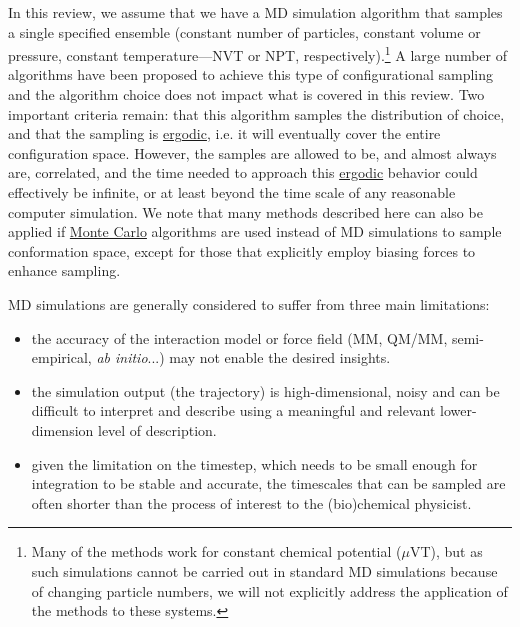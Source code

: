 \documentclass[9pt,review]{livecoms}
\begin{document}
In this review, we assume that we have a MD simulation algorithm that samples a single specified ensemble (constant number of particles, constant volume or pressure, constant temperature---NVT or NPT, respectively).\footnote{Many of the methods work for constant chemical potential ($\mu$VT), but as such simulations cannot be carried out in standard MD simulations because of changing particle numbers, we will not explicitly address the application of the methods to these systems.} A large number of algorithms have been proposed to achieve this type of configurational sampling and the algorithm choice does not impact what is covered in this review. Two important criteria remain: that this algorithm samples the distribution of choice, and that the sampling is \hyperlink{ref:ergodic} {ergodic}, i.e. it will eventually cover the entire configuration space. However, the samples are allowed to be, and almost always are, correlated, and the time needed to approach this \hyperlink{ref:ergodic} {ergodic} behavior could effectively be infinite, or at least beyond the time scale of any reasonable computer simulation. We note that many methods described here can also be applied if \hyperlink{ref:MetropolisMonteCarlo} {Monte Carlo} algorithms are used instead of MD simulations to sample conformation space, except for those that explicitly employ biasing forces to enhance sampling.

MD simulations are generally considered to suffer from three main limitations:
\begin{itemize}
    \item the accuracy of the interaction model or force field (MM, QM/MM, semi-empirical, \emph{ab initio}...) may not enable the desired insights.
    \item the simulation output (the trajectory) is high-dimensional, noisy and can be difficult to interpret and describe using a meaningful and relevant lower-dimension level of description.
    \item given the limitation on the timestep, which needs to be small enough for integration to be stable and accurate, the timescales that can be sampled are often shorter than the process of interest to the (bio)chemical physicist.
\end{itemize}
\end{document}
